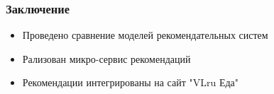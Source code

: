\documentclass[10pt, unicode]{beamer}
\begin{document}
\begin{frame}
  \frametitle{Заключение}
  \begin{itemize}
    \item Проведено сравнение моделей рекомендательных систем
    \item Рализован микро-сервис рекомендаций
    \item Рекомендации интегрированы на сайт "VLru Еда"
  \end{itemize}
\end{frame}
\end{document}
